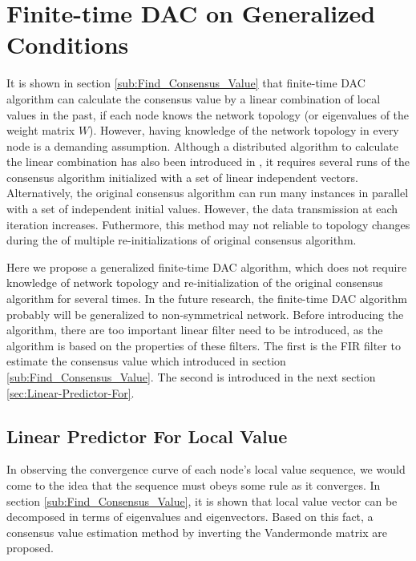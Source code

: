 
\chapter{\label{sub:Finite-time-Consensus-on}Finite-time DAC on Generalized
Conditions }



It is shown in section \ref{sub:Find_Consensus_Value} that finite-time
DAC algorithm can calculate the consensus value by a linear combination
of local values in the past, if each node knows the network topology
(or eigenvalues of the weight matrix $W$). However, having knowledge
of the network topology in every node is a demanding assumption. Although
a distributed algorithm to calculate the linear combination has also
been introduced in \cite{Sundaram2007}, it requires several runs
of the consensus algorithm initialized with a set of linear independent
vectors. Alternatively, the original consensus algorithm can run many
instances in parallel with a set of independent initial values. However,
the data transmission at each iteration increases. Futhermore, this
method may not reliable to topology changes during the of multiple
re-initializations of original consensus algorithm. 

Here we propose a generalized finite-time DAC algorithm, which does
not require knowledge of network topology and re-initialization of
the original consensus algorithm for several times. In the future
research, the finite-time DAC algorithm probably will be generalized
to non-symmetrical network. Before introducing the algorithm, there
are too important linear filter need to be introduced, as the algorithm
is based on the properties of these filters. The first is the FIR
filter to estimate the consensus value which introduced in section
\ref{sub:Find_Consensus_Value}. The second is introduced in the next
section \ref{sec:Linear-Predictor-For}.


\section{\label{sec:Linear-Predictor-For}Linear Predictor For Local Value
}

In observing the convergence curve of each node's local value sequence,
we would come to the idea that the sequence must obeys some rule as
it converges. In section \ref{sub:Find_Consensus_Value}, it is shown
that local value vector can be decomposed in terms of eigenvalues
and eigenvectors. Based on this fact, a consensus value estimation
method by inverting the Vandermonde matrix  are proposed.

